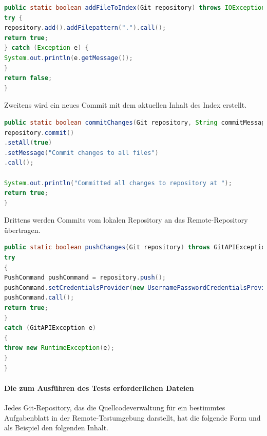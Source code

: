 \documentclass[a4paper,12pt,oneside]{book}
\begin{document}
\begin{lstlisting}[language=JAVA,caption=Add File To Index ]
public static boolean addFileToIndex(Git repository) throws IOException, GitAPIException {
try {
repository.add().addFilepattern(".").call();
return true;
} catch (Exception e) {
System.out.println(e.getMessage());
}
return false;
}
\end{lstlisting} 
Zweitens wird ein neues Commit mit dem aktuellen Inhalt des Index erstellt.
\begin{lstlisting}[language=JAVA,caption=commit Changes ]
	public static boolean commitChanges(Git repository, String commitMessage) throws GitAPIException, IOException {
repository.commit()
.setAll(true)
.setMessage("Commit changes to all files")
.call();

System.out.println("Committed all changes to repository at ");
return true;
}
\end{lstlisting} 
Drittens werden Commits vom lokalen Repository an das Remote-Repository übertragen.
\begin{lstlisting}[language=JAVA,caption=Push Changes ]
public static boolean pushChanges(Git repository) throws GitAPIException, URISyntaxException, IOException {
try
{
PushCommand pushCommand = repository.push();
pushCommand.setCredentialsProvider(new UsernamePasswordCredentialsProvider("swissi", "Mh123456"));
pushCommand.call();
return true;
}
catch (GitAPIException e)
{
throw new RuntimeException(e);
}
}
\end{lstlisting} 

 
\paragraph{Die zum Ausführen des Tests erforderlichen Dateien}
Jedes Git-Repository, das die Quellcodeverwaltung für ein bestimmtes Aufgabenblatt in der Remote-Testumgebung darstellt, hat die folgende Form und als Beispiel den folgenden Inhalt.
\newline
{}
\end{document}

